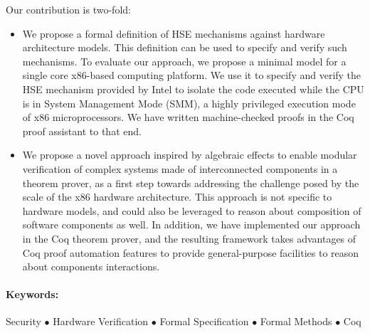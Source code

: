 Our contribution is two-fold:
%
\begin{itemize}
\item We propose a formal definition of HSE mechanisms against hardware
  architecture models. This definition can be used to specify and verify such mechanisms.
  To evaluate our approach, we propose a minimal model for a single core
  x86-based computing platform.
  We use it to specify and verify the HSE mechanism provided by Intel to isolate
  the code executed while the CPU is in System Management Mode (SMM), a highly
  privileged execution mode of x86 microprocessors.
  We have written machine-checked proofs in the Coq proof assistant to that
  end.
\item We propose a novel approach inspired by algebraic effects to enable
  modular verification of complex systems made of interconnected components in a
  theorem prover, as a first step towards addressing the challenge posed by the
  scale of the x86 hardware architecture.
  This approach is not specific to hardware models, and could also be leveraged
  to reason about composition of software components as well.
  In addition, we have implemented our approach in the Coq theorem prover, and
  the resulting framework takes advantages of Coq proof automation features to
  provide general-purpose facilities to reason about components interactions.
\end{itemize}

\paragraph{Keywords:}
%
Security $\bullet$ Hardware Verification $\bullet$ Formal Specification
$\bullet$ Formal Methods $\bullet$ Coq

